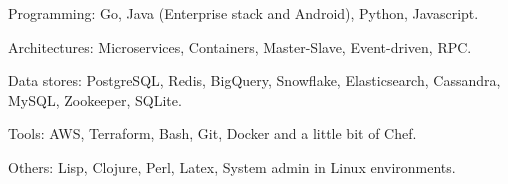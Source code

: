 \begin{rlist}
  \item Programming: Go, Java (Enterprise stack and Android), Python, Javascript.
  \item Architectures: Microservices, Containers, Master-Slave, Event-driven, RPC.
  \item Data stores: PostgreSQL, Redis, BigQuery, Snowflake, Elasticsearch, Cassandra, MySQL, Zookeeper, SQLite.
  \item Tools: AWS, Terraform, Bash, Git, Docker and a little bit of Chef.
  \item Others: Lisp, Clojure, Perl, Latex, System admin in Linux environments.
\end{rlist}

